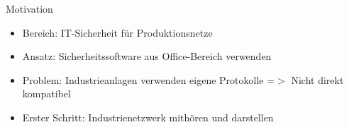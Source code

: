 \begin{frame}{Motivation}
    \begin{itemize}[<+->]
      \item Bereich: IT-Sicherheit für Produktionsnetze
      \item Ansatz: Sicherheitssoftware aus Office-Bereich verwenden
      \item Problem: Industrieanlagen verwenden eigene Protokolle
            \newline =$>$ Nicht direkt kompatibel
      \item Erster Schritt: Industrienetzwerk mithören und darstellen
    \end{itemize}
\end{frame} 